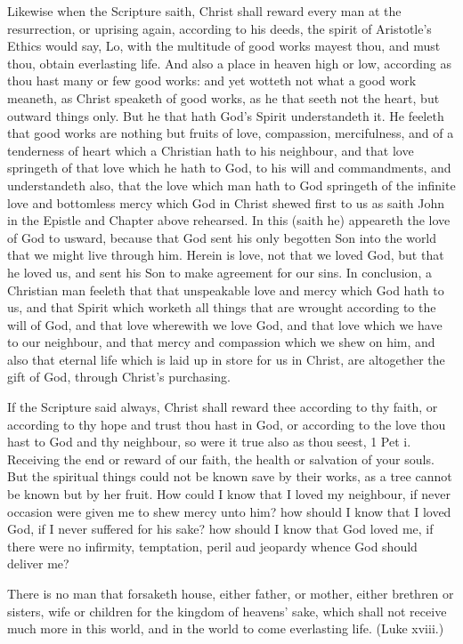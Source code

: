 Likewise when the Scripture saith, Christ shall reward 
every man at the resurrection, or uprising again, according 
to his deeds, the spirit of Aristotle's Ethics would say,
Lo, with the multitude of good works mayest thou, and
must thou, obtain everlasting life. And also a place in 
heaven high or low, according as thou hast many or few 
good works: and yet wotteth not what a good work 
meaneth, as Christ speaketh of good works, as he that 
seeth not the heart, but outward things only. But he 
that hath God's Spirit understandeth it. He feeleth that 
good works are nothing but fruits of love, compassion, 
mercifulness, and of a tenderness of heart which a 
Christian hath to his neighbour, and that love springeth 
of that love which he hath to God, to his will and commandments,
and understandeth also, that the love which 
man hath to God springeth of the infinite love and bottomless
mercy which God in Christ shewed first to us 
as saith John in the Epistle and Chapter above rehearsed. 
In this (saith he) appeareth the love of God to usward, 
because that God sent his only begotten Son into the 
world that we might live through him. Herein is love, 
not that we loved God, but that he loved us, and sent his 
Son to make agreement for our sins. In conclusion, a 
Christian man feeleth that that unspeakable love and mercy 
which God hath to us, and that Spirit which worketh all 
things that are wrought according to the will of God, 
and that love wherewith we love God, and that love 
which we have to our neighbour, and that mercy and compassion
which we shew on him, and also that eternal life 
which is laid up in store for us in Christ, are altogether 
the gift of God, through Christ's purchasing. 

If the Scripture said always, Christ shall reward thee according
to thy faith, or according to thy hope and trust thou 
hast in God, or according to the love thou hast to God and thy 
neighbour, so were it true also as thou seest, 1 Pet i. Receiving
the end or reward of our faith, the health or salvation of 
your souls. But the spiritual things could not be known save 
by their works, as a tree cannot be known but by her 
fruit. How could I know that I loved my neighbour, if 
never occasion were given me to shew mercy unto him? 
how should I know that I loved God, if I never suffered 
for his sake? how should I know that God loved me, if 
there were no infirmity, temptation, peril aud jeopardy 
whence God should deliver me? 


There is no man that forsaketh house, either father, or 
mother, either brethren or sisters, wife or children for the 
kingdom of heavens' sake, which shall not receive much 
more in this world, and in the world to come everlasting 
life. (Luke xviii.) 

